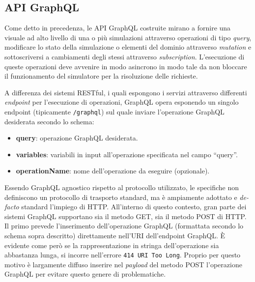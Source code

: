 \subsection{API GraphQL}\label{ssec:server-gql-apis}
Come detto in precedenza, le API GraphQL costruite mirano a fornire una visuale ad alto livello di una o più simulazioni attraverso operazioni di tipo \textit{query},
modificare lo stato della simulazione o elementi del dominio attraverso \textit{mutation} e sottoscriversi a cambiamenti degli stessi attraverso \textit{subscription}.
L'esecuzione di queste operazioni deve avvenire in modo asincrono in modo tale da non bloccare il funzionamento del simulatore per la risoluzione delle richieste.

A differenza dei sistemi \ac{REST}ful, i quali espongono i servizi attraverso differenti \textit{endpoint} per l'esecuzione di operazioni, GraphQL opera esponendo un
singolo endpoint (tipicamente \texttt{/graphql}) sul quale inviare l'operazione GraphQL desiderata secondo lo schema:
\begin{itemize}
    \item \textbf{query}: operazione GraphQL desiderata.
    \item \textbf{variables}: variabili in input all'operazione specificata nel campo ``query''.
    \item \textbf{operationName}: nome dell'operazione da eseguire (opzionale).
\end{itemize}
Essendo GraphQL agnostico rispetto al protocollo utilizzato, le specifiche non definiscono un protocollo di trasporto standard, ma è ampiamente adottato
e \textit{de-facto} standard l'impiego di HTTP.
All'interno di questo contesto, gran parte dei sistemi GraphQL supportano sia il metodo GET, sia il metodo POST di HTTP. Il primo prevede l'inserimento
dell'operazione GraphQL (formattata secondo lo schema sopra descritto) direttamente nell'URI dell'endpoint GraphQL. È evidente come però se la rappresentazione
in stringa dell'operazione sia abbastanza lunga, si incorre nell'errore \texttt{414 URI Too Long}. Proprio per questo motivo è largamente diffuso inserire
nel \textit{payload} del metodo POST l'operazione GraphQL per evitare questo genere di problematiche.


